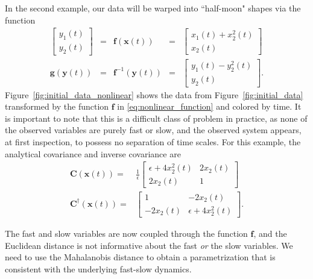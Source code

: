 In the second example, our data will be warped into ``half-moon" shapes via the function
\begin{equation} \label{eq:nonlinear_function}
\begin{aligned}
\begin{bmatrix}
y_1(t) \\ y_2(t)
\end{bmatrix} &=&
\mathbf{f}(\mathbf{x}(t)) &=&
\begin{bmatrix}
x_1(t) + x_2^2(t) \\
x_2(t)
\end{bmatrix}\\
\mathbf{g}(\mathbf{y}(t)) &=& \mathbf{f}^{-1} (\mathbf{y}(t)) &=& \begin{bmatrix} y_1(t) - y_2^2(t) \\ y_2(t) \end{bmatrix} .
\end{aligned}
\end{equation}
%
Figure~\ref{fig:initial_data_nonlinear} shows the data from Figure~\ref{fig:initial_data} transformed by the function $\mathbf{f}$ in \eqref{eq:nonlinear_function} and colored by time.
%
It is important to note that this is a difficult class of problem in practice, as none of the observed
variables are purely fast or slow, and the observed system appears, at first inspection, to possess no separation
of time scales.
%
For this example, the analytical covariance and inverse covariance are
\begin{equation}
\begin{aligned}
\mathbf{C}(\mathbf{x}(t)) =&
\frac{1}{\epsilon}
 \begin{bmatrix}
\epsilon + 4x_2^2(t) & 2x_2(t) \\
2x_2(t) & 1
\end{bmatrix}\\
\mathbf{C}^{\dagger}(\mathbf{x}(t)) =&
\begin{bmatrix}
1 & -2 x_2(t) \\
-2 x_2(t) & \epsilon+ 4 x_2^2(t)
\end{bmatrix} .
\end{aligned}
\end{equation}

The fast and slow variables are now coupled through the function $\mathbf{f}$, and the Euclidean distance is not informative about the fast {\em or} the slow variables.
%
We need to use the Mahalanobis distance to obtain a parametrization that is consistent with the underlying fast-slow dynamics.

